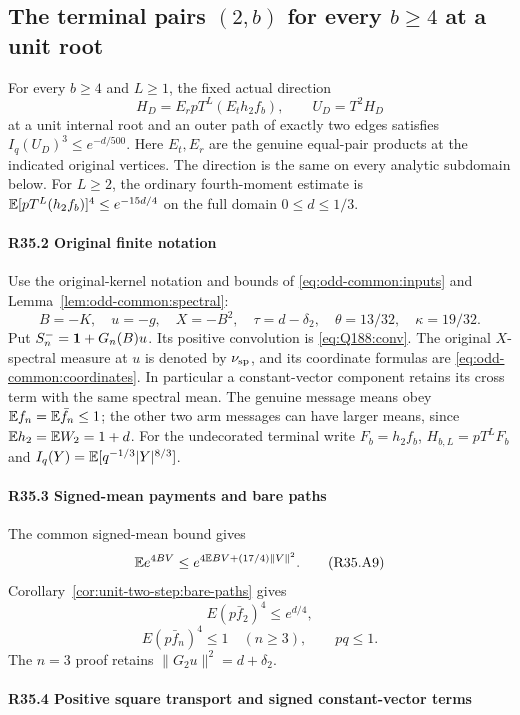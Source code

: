 \subsection{The terminal pairs $(2,b)$ for every $b\ge4$ at a unit root}\label{proof:R2-C035}
For every $b\ge4$ and $L\ge1$, the fixed actual direction
\[
H_D=E_rpT^L(E_th_2f_b),\qquad U_D=T^2H_D
\]
at a unit internal root and an outer path of exactly two edges satisfies $I_q(U_D)^3\le e^{-d/500}$. Here $E_t,E_r$ are the genuine equal-pair products at the indicated original vertices. The direction is the same on every analytic subdomain below. For $L\ge2$, the ordinary fourth-moment estimate is $\mathbb E[pT^L(h_2f_b)]^4\le e^{-15d/4}$ on the full domain $0\le d\le1/3$.

\paragraph{R35.2 Original finite notation}
Use the original-kernel notation and bounds of
\eqref{eq:odd-common:inputs} and Lemma~\ref{lem:odd-common:spectral}:
\[
 B=-K,\quad u=-g,\quad X=-B^2,\quad
 \tau=d-\delta_2,\quad\theta=13/32,\quad\kappa=19/32.
\]
Put $S_n^-=\mathbf1+G_n(B)u$. Its positive convolution is
\eqref{eq:Q188:conv}. The original $X$-spectral measure at $u$
is denoted by $\nu_{\rm sp}$, and its coordinate formulas are
\eqref{eq:odd-common:coordinates}. In particular a constant-vector
component retains its cross term with the same spectral mean.
The genuine message means obey $\mathbb E f_n=\mathbb E\bar f_n\le1$;
the other two arm messages can have larger means, since
$\mathbb E h_2=\mathbb E W_2=1+d$.
For the undecorated terminal write
$F_b=h_2f_b$, $H_{b,L}=pT^LF_b$ and
$I_q(Y)=\mathbb E[q^{-1/3}|Y|^{8/3}]$.

\paragraph{R35.3 Signed-mean payments and bare paths}
The common signed-mean bound gives
\[
 \mathbb E e^{4BV}\le e^{4\mathbb E BV+(17/4)\|V\|^2}.\tag{R35.A9}
\]
Corollary~\ref{cor:unit-two-step:bare-paths} gives
\[
 E(p\bar f_2)^4\le e^{d/4},\tag{R35.A10}
\]
\[
 E(p\bar f_n)^4\le1\quad(n\ge3),\qquad pq\le1.\tag{R35.A11}
\]
The $n=3$ proof retains $\|G_2u\|^2=d+\delta_2$.

\paragraph{R35.4 Positive square transport and signed constant-vector terms}

